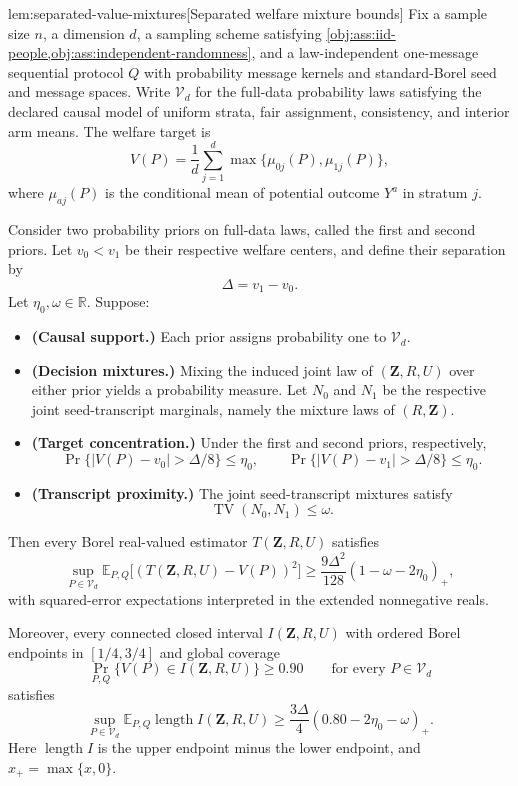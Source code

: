 \documentclass[11pt]{article}
\begin{document}
\begin{lemmav}{lem:separated-value-mixtures}[Separated welfare mixture bounds]
Fix a sample size \(n\), a dimension \(d\), a sampling scheme satisfying \cref{obj:ass:iid-people,obj:ass:independent-randomness}, and a law-independent one-message sequential protocol \(Q\) with probability message kernels and standard-Borel seed and message spaces. Write \(\mathcal V_d\) for the full-data probability laws satisfying the declared causal model of uniform strata, fair assignment, consistency, and interior arm means. The welfare target is
\[
V(P)=\frac{1}{d}\sum_{j=1}^{d}
\max\{\mu_{0j}(P),\mu_{1j}(P)\},
\]
where \(\mu_{aj}(P)\) is the conditional mean of potential outcome \(Y^a\) in stratum \(j\).

Consider two probability priors on full-data laws, called the first and second priors. Let \(v_0<v_1\) be their respective welfare centers, and define their separation by
\[
\Delta=v_1-v_0.
\]
Let \(\eta_0,\omega\in\mathbb R\). Suppose:
\begin{itemize}
\item \textbf{(Causal support.)} Each prior assigns probability one to \(\mathcal V_d\).
\item \textbf{(Decision mixtures.)} Mixing the induced joint law of \((\mathbf Z,R,U)\) over either prior yields a probability measure. Let \(N_0\) and \(N_1\) be the respective joint seed-transcript marginals, namely the mixture laws of \((R,\mathbf Z)\).
\item \textbf{(Target concentration.)} Under the first and second priors, respectively,
\[
\Pr\{|V(P)-v_0|>\Delta/8\}\le\eta_0,
\qquad
\Pr\{|V(P)-v_1|>\Delta/8\}\le\eta_0.
\]
\item \textbf{(Transcript proximity.)} The joint seed-transcript mixtures satisfy
\[
\operatorname{TV}(N_0,N_1)\le\omega.
\]
\end{itemize}

Then every Borel real-valued estimator \(T(\mathbf Z,R,U)\) satisfies
\[
\sup_{P\in\mathcal V_d}
\mathbb E_{P,Q}\bigl[(T(\mathbf Z,R,U)-V(P))^2\bigr]
\ge
\frac{9\Delta^2}{128}(1-\omega-2\eta_0)_+,
\]
with squared-error expectations interpreted in the extended nonnegative reals.

Moreover, every connected closed interval \(I(\mathbf Z,R,U)\) with ordered Borel endpoints in \([1/4,3/4]\) and global coverage
\[
\Pr_{P,Q}\{V(P)\in I(\mathbf Z,R,U)\}\ge0.90
\qquad\text{for every }P\in\mathcal V_d
\]
satisfies
\[
\sup_{P\in\mathcal V_d}
\mathbb E_{P,Q}\operatorname{length}I(\mathbf Z,R,U)
\ge
\frac{3\Delta}{4}(0.80-2\eta_0-\omega)_+.
\]
Here \(\operatorname{length}I\) is the upper endpoint minus the lower endpoint, and \(x_+=\max\{x,0\}\).
\end{lemmav}
\end{document}
